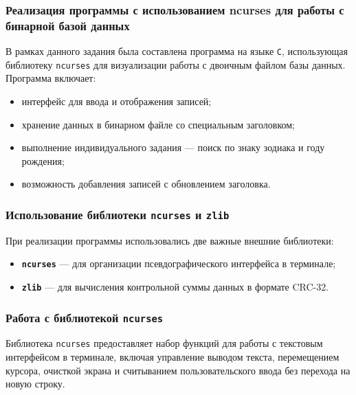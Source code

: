 \subsubsection{Реализация программы с использованием ncurses для работы с бинарной базой данных}

В рамках данного задания была составлена программа на языке \texttt{C}, использующая библиотеку \texttt{ncurses} для визуализации работы с двоичным файлом базы данных. Программа включает:

\begin{itemize}
    \item интерфейс для ввода и отображения записей;
    \item хранение данных в бинарном файле со специальным заголовком;
    \item выполнение индивидуального задания --- поиск по знаку зодиака и году рождения;
    \item возможность добавления записей с обновлением заголовка.
\end{itemize}

\subsubsection*{Использование библиотеки \texttt{ncurses} и \texttt{zlib}}

При реализации программы использовались две важные внешние библиотеки:

\begin{itemize}
    \item \textbf{\texttt{ncurses}} — для организации псевдографического интерфейса в терминале;
    \item \textbf{\texttt{zlib}} — для вычисления контрольной суммы данных в формате CRC-32.
\end{itemize}

\subsubsection{Работа с библиотекой \texttt{ncurses}}

Библиотека \texttt{ncurses} предоставляет набор функций для работы с текстовым интерфейсом в терминале, включая управление выводом текста, перемещением курсора, очисткой экрана и считыванием пользовательского ввода без перехода на новую строку.

